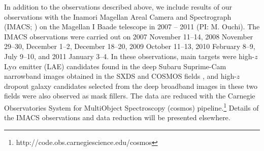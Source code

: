 \documentclass[]{pasj01}
\begin{document}
In addition to the observations described above, 
we include results of our observations with 
the Inamori Magellan Areal Camera and Spectrograph (IMACS; \cite{2011PASP..123..288D})
on the Magellan I Baade telescope in 2007 -- 2011 (PI: M. Ouchi). 
The IMACS observations were carried out on 
2007 November 11--14, 
2008 November 29--30, 
December 1--2,  
December 18--20,  
2009 October 11--13, 
2010 February 8--9, 
July 9--10,  
and 
2011 January 3--4. 
In these observations, 
main targets were 
high-$z$ Ly$\alpha$ emitter (LAE) candidates 
found in the deep Subaru Suprime-Cam narrowband images 
obtained in the SXDS \citep{2008ApJS..176..301O,2010ApJ...723..869O} 
and COSMOS fields \citep{2007ApJS..172..523M,2009ApJ...696..546S}, 
and 
high-$z$ dropout galaxy candidates 
selected from the deep broadband images 
in these two fields 
\citep{2008ApJS..176....1F,2007ApJS..172...99C} 
were also observed as mask fillers. 
The data are reduced with the Carnegie Observatories System for MultiObject Spectroscopy 
({\sc cosmos}) pipeline.\footnote{http://code.obs.carnegiescience.edu/cosmos}
Details of the IMACS observations and data reduction will be presented elsewhere. 
\end{document}
